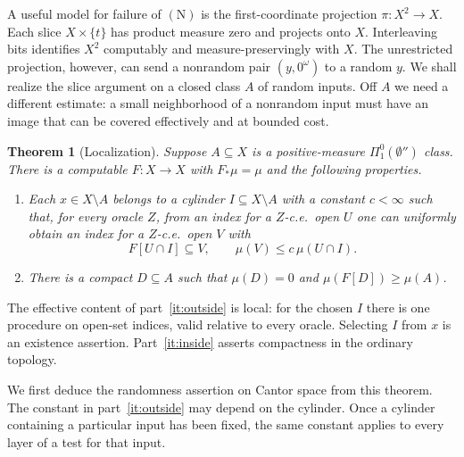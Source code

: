 \documentclass[12pt,reqno]{amsart}
\newtheorem{theorem}{Theorem}[section]
\newcommand{\Nprop}{\mathrm{(N)}}
\newcommand{\mass}{\mu}
\newcommand{\djump}{\emptyset''}
\begin{document}
A useful model for failure of $\Nprop$ is the first-coordinate projection
$\pi:X^2\to X$. Each slice $X\times\{t\}$ has product measure zero and
projects onto $X$. Interleaving bits identifies $X^2$ computably and
measure-preservingly with $X$. The unrestricted projection, however, can
send a nonrandom pair $(y,0^\omega)$ to a random $y$. We shall realize the
slice argument on a closed class $A$ of random inputs. Off $A$ we need a
different estimate: a small neighborhood of a nonrandom input must have
an image that can be covered effectively and at bounded cost.

\begin{theorem}[Localization]\label{thm:local}
Suppose $A\subseteq X$ is a positive-measure $\Pi^0_1(\djump)$ class. There
is a computable $F:X\to X$ with $F_*\mass=\mass$ and the following properties.
\begin{enumerate}
\item\label{it:outside} Each $x\in X\setminus A$ belongs to a cylinder
  $I\subseteq X\setminus A$ with a constant $c<\infty$ such that, for
  every oracle $Z$, from an index for a $Z$-c.e.\ open $U$ one can uniformly
  obtain an index for a $Z$-c.e.\ open $V$ with
  \[
       F[U\cap I]\subseteq V,\qquad \mass(V)\le c\,\mass(U\cap I).
  \]
\item\label{it:inside} There is a compact $D\subseteq A$ such that
  $\mass(D)=0$ and $\mass(F[D])\ge\mass(A)$.
\end{enumerate}
\end{theorem}

The effective content of part~\eqref{it:outside} is local: for the
chosen $I$ there is one procedure on open-set indices, valid relative
to every oracle. Selecting $I$ from $x$ is an existence assertion.
Part~\eqref{it:inside} asserts compactness in the ordinary topology.

We first deduce the randomness assertion on Cantor space from this theorem.
The constant in part~\eqref{it:outside} may depend on the cylinder. Once a
cylinder containing a particular input has been fixed, the same constant
applies to every layer of a test for that input.
\end{document}
